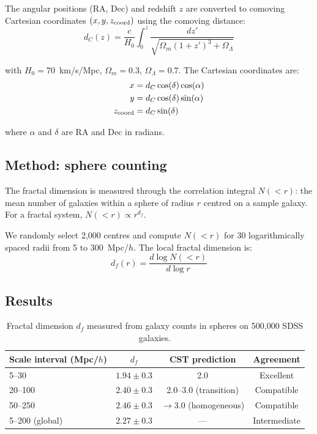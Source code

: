 \documentclass[10pt,a4paper]{article}
\begin{document}
The angular positions (RA, Dec) and redshift $z$ are converted to comoving Cartesian coordinates $(x, y, z_{\rm coord})$ using the comoving distance:
\begin{equation}
d_C(z) = \frac{c}{H_0} \int_0^z \frac{dz'}{\sqrt{\Omega_m(1+z')^3 + \Omega_\Lambda}}
\end{equation}

with $H_0 = 70$~km/s/Mpc, $\Omega_m = 0.3$, $\Omega_\Lambda = 0.7$. The Cartesian coordinates are:
\begin{align}
x &= d_C \cos(\delta) \cos(\alpha) \\
y &= d_C \cos(\delta) \sin(\alpha) \\
z_{\rm coord} &= d_C \sin(\delta)
\end{align}

where $\alpha$ and $\delta$ are RA and Dec in radians.

\subsection{Method: sphere counting}

The fractal dimension is measured through the correlation integral $N(<r)$: the mean number of galaxies within a sphere of radius $r$ centred on a sample galaxy. For a fractal system, $N(<r) \propto r^{d_f}$.

We randomly select 2,000 centres and compute $N(<r)$ for 30 logarithmically spaced radii from 5 to 300~Mpc/$h$. The local fractal dimension is:
\begin{equation}
d_f(r) = \frac{d \log N(<r)}{d \log r}
\end{equation}

\subsection{Results}

\begin{table}[h]
\centering
\caption{Fractal dimension $d_f$ measured from galaxy counts in spheres on 500,000 SDSS galaxies.}\label{tab:df}
\begin{tabular}{lccc}
\toprule
Scale interval (Mpc/$h$) & $d_f$ & CST prediction & Agreement \\
\midrule
5--30 & $1.94 \pm 0.3$ & 2.0 & Excellent \\
20--100 & $2.40 \pm 0.3$ & 2.0--3.0 (transition) & Compatible \\
50--250 & $2.46 \pm 0.3$ & $\to 3.0$ (homogeneous) & Compatible \\
5--200 (global) & $2.27 \pm 0.3$ & --- & Intermediate \\
\bottomrule
\end{tabular}
\end{table}
\end{document}
